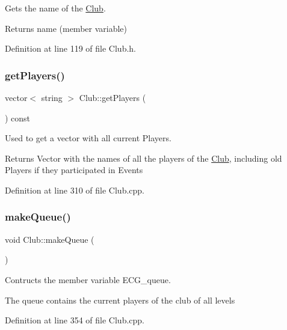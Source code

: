 Gets the name of the \hyperlink{class_club}{Club}. 

\begin{DoxyReturn}{Returns}
name (member variable) 
\end{DoxyReturn}


Definition at line 119 of file Club.\+h.

\hypertarget{class_club_ae3423e40b8af98a1e3844cbdc0ca87f7}{}\label{class_club_ae3423e40b8af98a1e3844cbdc0ca87f7} 
\subsubsection{\texorpdfstring{get\+Players()}{getPlayers()}}
{\footnotesize\ttfamily vector$<$ string $>$ Club\+::get\+Players (\begin{DoxyParamCaption}{ }\end{DoxyParamCaption}) const}



Used to get a vector with all current Players. 

\begin{DoxyReturn}{Returns}
Vector with the names of all the players of the \hyperlink{class_club}{Club}, including old Players if they participated in Events 
\end{DoxyReturn}


Definition at line 310 of file Club.\+cpp.

\hypertarget{class_club_a389972412da4a5b1cd62965ceefad7fe}{}\label{class_club_a389972412da4a5b1cd62965ceefad7fe} 
\subsubsection{\texorpdfstring{make\+Queue()}{makeQueue()}}
{\footnotesize\ttfamily void Club\+::make\+Queue (\begin{DoxyParamCaption}{ }\end{DoxyParamCaption})}



Contructs the member variable E\+C\+G\+\_\+queue. 

The queue contains the current players of the club of all levels 

Definition at line 354 of file Club.\+cpp.

\hypertarget{class_club_a44a4556487884659d9b316dc6c961e86}{}\label{class_club_a44a4556487884659d9b316dc6c961e86} 
